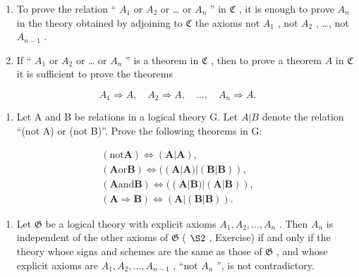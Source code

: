 \begin{enumerate}
\def\labelenumi{(\alph{enumi})}
\item
  To prove the relation `` \(A_{1}\) or \(A_{2}\) or \ldots{} or \(A_{n}\) '' in \(\mathfrak{C}\) , it is enough to prove \(A_{n}\) in the theory obtained by adjoining to \(\mathfrak{C}\) the axioms not \(A_{1}\) , not \(A_{2}\) , \ldots, not \(A_{n-1}\) .
\item
  If `` \(A_{1}\) or \(A_{2}\) or \ldots{} or \(A_{n}\) '' is a theorem in \(\mathfrak{C}\) , then to prove a theorem \(A\) in \(\mathfrak{C}\) it is sufficient to prove the theorems
\end{enumerate}

\[
A _ {1} \Longrightarrow A, \quad A _ {2} \Longrightarrow A, \quad \dots , \quad A _ {n} \Longrightarrow A.
\]

\begin{enumerate}
\def\labelenumi{\arabic{enumi}.}
\setcounter{enumi}{3}
\tightlist
\item
  Let A and B be relations in a logical theory G. Let \(A|B\) denote the relation ``(not A) or (not B)''. Prove the following theorems in G:
\end{enumerate}

\[
\begin{array}{c} (\text {not} \boldsymbol {A}) \Longleftrightarrow (\boldsymbol {A} | \boldsymbol {A}), \\ (\boldsymbol {A} \text {or} \boldsymbol {B}) \Longleftrightarrow ((\boldsymbol {A} | \boldsymbol {A}) | (\boldsymbol {B} | \boldsymbol {B})), \\ (\boldsymbol {A} \text {and} \boldsymbol {B}) \Longleftrightarrow ((\boldsymbol {A} | \boldsymbol {B}) | (\boldsymbol {A} | \boldsymbol {B})), \\ (\boldsymbol {A} \Longrightarrow \boldsymbol {B}) \Longleftrightarrow (\boldsymbol {A} | (\boldsymbol {B} | \boldsymbol {B})). \end{array}
\]

\begin{enumerate}
\def\labelenumi{\arabic{enumi}.}
\setcounter{enumi}{4}
\tightlist
\item
  Let \(\mathfrak{G}\) be a logical theory with explicit axioms \(A_{1}, A_{2}, \ldots, A_{n}\) . Then \(A_{n}\) is independent of the other axioms of \(\mathfrak{G}\) ( \(\S 2\) , Exercise) if and only if the theory whose signs and schemes are the same as those of \(\mathfrak{G}\) , and whose explicit axioms are \(A_{1}, A_{2}, \ldots, A_{n-1}\) , ``not \(A_{n}\) '', is not contradictory.
\end{enumerate}

